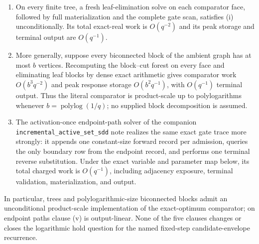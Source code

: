 \begin{proposition}
\begin{enumerate}[label=(\roman*)]
\item On every finite tree, a fresh leaf-elimination solve on each comparator
  face, followed by full materialization and the complete gate scan, satisfies
  (i) unconditionally.  Its total exact-real work is $O(q^{-2})$ and its peak
  storage and terminal output are $O(q^{-1})$.

\item More generally, suppose every biconnected block of the ambient graph
  has at most $b$ vertices.  Recomputing the block--cut forest on every face
  and eliminating leaf blocks by dense exact arithmetic gives comparator work
  $O(b^3q^{-2})$ and peak response storage $O(b^2q^{-1})$, with
  $O(q^{-1})$ terminal output.  Thus the literal comparator is
  product-scale up to polylogarithms whenever
  $b=\operatorname{polylog}(1/q)$; no supplied block decomposition is
  assumed.

\item The activation-once endpoint-path solver of the companion
  \texttt{incremental\_active\_set\_sdd} note realizes the same exact gate
  trace more strongly: it appends one constant-size forward record per
  admission, queries the only boundary row from the endpoint record, and
  performs one terminal reverse substitution.  Under the exact variable and
  parameter map below, its total charged work is $O(q^{-1})$, including
  adjacency exposure, terminal validation, materialization, and output.
\end{enumerate}
In particular, trees and polylogarithmic-size biconnected blocks admit an
unconditional product-scale implementation of the exact-optimum comparator;
on endpoint paths clause (v) is output-linear.  None of the five clauses
changes or closes the logarithmic
hold question for the named fixed-step candidate-envelope recurrence.
\end{proposition}

